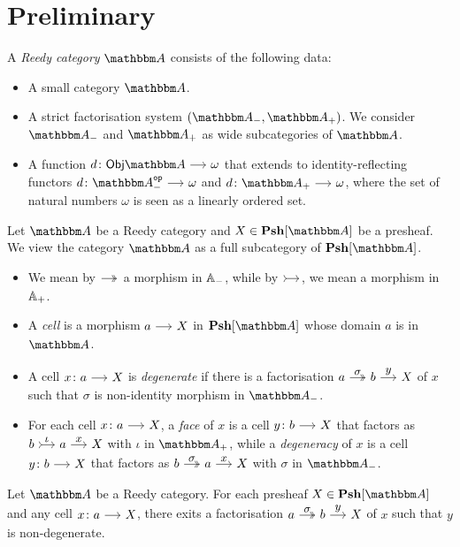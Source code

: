 \documentclass[a4paper,dvipsnames, 11pt]{amsart} %
\begin{document}
\maketitle
\section{Preliminary}
\begin{definition}
	A \emph{Reedy category} $\dgm{A}$ consists of the following data:
	\begin{itemize}
		\item %
			A small category $\dgm{A}$.
		\item %
			A strict factorisation system $(\dgm{A}_-,\dgm{A}_+)$.
			We consider $\dgm{A}_-$ and $\dgm{A}_+$ as wide subcategories of $\dgm{A}$.
		\item %
			A function $d\colon\Obj\dgm{A}\arr\omega$
			that extends to identity-reflecting functors
			$d\colon\dgm{A}^\op_-\arr\omega$ and $d\colon\dgm{A}_+\arr\omega$,
			where the set of natural numbers $\omega$ is seen as a linearly ordered set.
		\qedhere %
	\end{itemize}
\end{definition}
\begin{notation}
	Let $\dgm{A}$ be a Reedy category and $X\in\Psh[\dgm{A}]$ be a presheaf.
	We view the category $\dgm{A}$ as a full subcategory of $\Psh[\dgm{A}]$.
	\begin{itemize}
		\item %
			We mean by $\arr[two heads]$ a morphism in $\mathbb{A}_-$,
			while by $\arr[tail]$, we mean a morphism in $\mathbb{A}_+$.
		\item %
			A \emph{cell} is a morphism $a\arr X$ in $\Psh[\dgm{A}]$ whose domain $a$ is in $\dgm{A}$.
		\item %
			A cell $x\colon a\arr X$ is \emph{degenerate} if there is a factorisation $a\arr"\sigma"[two heads]b\arr"y"X$ of $x$
			such that $\sigma$ is non-identity morphism in $\dgm{A}_-$.
		\item %
			For each cell $x\colon a\arr X$,
			a \emph{face} of $x$ is a cell $y\colon b \arr X$ that factors as $b\arr"\iota"[tail]a\arr"x"X$ with $\iota$ in $\dgm{A}_+$,
			while a \emph{degeneracy} of $x$ is a cell $y\colon b \arr X$ that factors as $b\arr"\sigma"[two heads]a\arr"x"X$ with $\sigma$ in $\dgm{A}_-$.
		\qedhere %
	\end{itemize}
\end{notation}
\begin{lemma}
	\label{lem:existenceofNon-deg_factorisation}
	Let $\dgm{A}$ be a Reedy category.
	For each presheaf $X\in\Psh[\dgm{A}]$ and any cell $x\colon a\arr X$, there exits a factorisation
	$a\arr"\sigma"[two heads]b\arr"y"X$ of $x$ such that $y$ is non-degenerate.
\end{lemma}
\end{document}
